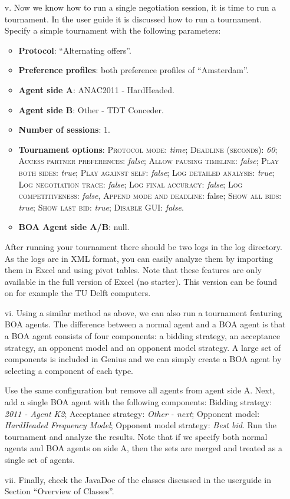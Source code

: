 \documentclass[a4paper]{article}
\begin{document}
\begin{enumerate}
	\item[v.] Now we know how to run a single negotiation session, it is time to run a tournament. In the user guide it is discussed how to run a tournament. Specify a simple tournament with the following parameters:
	\begin{itemize}
		\item \textbf{Protocol}: ``Alternating offers''.
		\item \textbf{Preference profiles}: both preference profiles of ``Amsterdam''.
		\item \textbf{Agent side A}: ANAC2011 - HardHeaded.
		\item \textbf{Agent side B}: Other - TDT Conceder.
		\item \textbf{Number of sessions}: 1.
		\item \textbf{Tournament options}: \textsc{Protocol mode}: \textit{time}; \textsc{Deadline (seconds)}: \textit{60}; \textsc{Access partner preferences}: \textit{false}; \textsc{Allow pausing timeline}: \textit{false}; \textsc{Play both sides}: \textit{true}; \textsc{Play against self}: \textit{false}; \textsc{Log detailed analysis}: \textit{true}; \textsc{Log negotiation trace}: \textit{false}; \textsc{Log final accuracy}: \textit{false}; \textsc{Log competitiveness}: \textit{false}, \textsc{Append mode and deadline}: false; \textsc{Show all bids}: \textit{true}; \textsc{Show last bid}: \textit{true}; \textsc{Disable GUI}: \textit{false}.
		\item \textbf{BOA Agent side A/B}: null.
	\end{itemize}
	After running your tournament there should be two logs in the log directory. As the logs are in XML format, you can easily analyze them by importing them in Excel and using pivot tables. Note that these features are only available in the full version of Excel (no starter). This version can be found on for example the TU Delft computers. 
	\item[vi.] Using a similar method as above, we can also run a tournament featuring BOA agents. The difference between a normal agent and a BOA agent is that a BOA agent consists of four components: a bidding strategy, an acceptance strategy, an opponent model and an opponent model strategy. A large set of components is included in Genius and we can simply create a BOA agent by selecting a component of each type.

Use the same configuration but remove all agents from agent side A. Next, add a single BOA agent with the following components: Bidding strategy: \textit{2011 - Agent K2}; Acceptance strategy: \textit{Other - next}; Opponent model: \textit{HardHeaded Frequency Model}; Opponent model strategy: \textit{Best bid}. Run the tournament and analyze the results. Note that if we specify both normal agents and BOA agents on side A, then the sets are merged and treated as a single set of agents.
	\item[vii.] Finally, check the JavaDoc of the classes discussed in the userguide in Section ``Overview of Classes''.
\end{enumerate}
\end{document}
